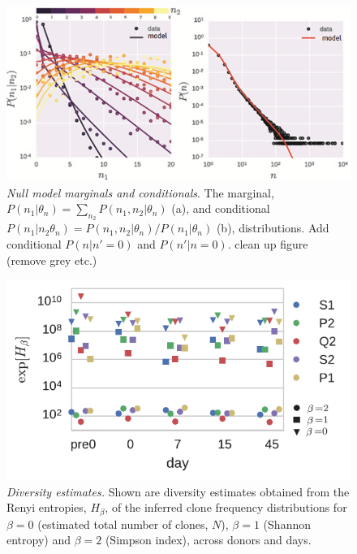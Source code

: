 \documentclass[letterpaper,english,prl,reprint,longbibliography]{revtex4-1} %
\begin{document}
\begin{figure}[ht!]
\includegraphics[width=\linewidth]{conditional_marginal}
\centering{}
\caption{
\emph{Null model marginals and conditionals}. The marginal, $P(n_1|\theta_n)=\sum_{n_2}P(n_1,n_2|\theta_n)$ (a), and conditional $P(n_1|n_2\theta_n)=P(n_1,n_2|\theta_n)/P(n_1|\theta_n)$ (b), distributions.{\color{red} Add conditional $P(n|n'=0)$ and $P(n'|n=0)$. clean up figure (remove grey etc.)}
\label{fig:modelfit}}
\end{figure}

\begin{figure}[ht!]
\includegraphics{fig4_div_estimates}
\centering{}
\caption{
\emph{Diversity estimates.} Shown are diversity estimates obtained from the Renyi entropies, $H_\beta$, of the inferred clone frequency distributions for $\beta=0$ (estimated total number of clones, $N$), $\beta=1$ (Shannon entropy) and $\beta=2$ (Simpson index), across donors and days.
\label{fig:div_estimates}}
\end{figure}

\end{document}
